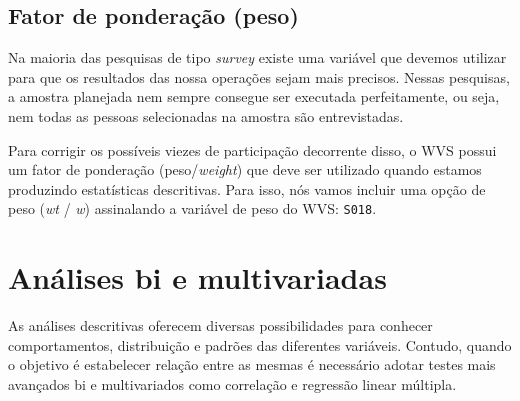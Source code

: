 \documentclass[
  10pt,
  brazil,
  a4paper,
  twoside, notitlepage, openright]{book}
\newenvironment{Shaded}{\begin{snugshade}}{\end{snugshade}}
\newcommand{\CommentTok}[1]{\textcolor[rgb]{0.56,0.35,0.01}{\textit{#1}}}
\newcommand{\DataTypeTok}[1]{\textcolor[rgb]{0.13,0.29,0.53}{#1}}
\newcommand{\KeywordTok}[1]{\textcolor[rgb]{0.13,0.29,0.53}{\textbf{#1}}}
\newcommand{\NormalTok}[1]{#1}
\newcommand{\OperatorTok}[1]{\textcolor[rgb]{0.81,0.36,0.00}{\textbf{#1}}}
\newcommand{\OtherTok}[1]{\textcolor[rgb]{0.56,0.35,0.01}{#1}}
\newcommand{\StringTok}[1]{\textcolor[rgb]{0.31,0.60,0.02}{#1}}
\begin{document}
\hypertarget{fator-de-ponderauxe7uxe3o-peso}{%
\subsection{Fator de ponderação (peso)}\label{fator-de-ponderauxe7uxe3o-peso}}

Na maioria das pesquisas de tipo \emph{survey} existe uma variável que devemos utilizar para que os resultados das nossa operações sejam mais precisos. Nessas pesquisas, a amostra planejada nem sempre consegue ser executada perfeitamente, ou seja, nem todas as pessoas selecionadas na amostra são entrevistadas.

Para corrigir os possíveis viezes de participação decorrente disso, o WVS possui um fator de ponderação (peso/\emph{weight}) que deve ser utilizado quando estamos produzindo estatísticas descritivas. Para isso, nós vamos incluir uma opção de peso (\emph{wt} / \emph{w}) assinalando a variável de peso do WVS: \texttt{S018}.

\begin{Shaded}
\end{Shaded}

\hypertarget{anuxe1lises-bi-e-multivariadas}{%
\section{Análises bi e multivariadas}\label{anuxe1lises-bi-e-multivariadas}}

As análises descritivas oferecem diversas possibilidades para conhecer comportamentos, distribuição e padrões das diferentes variáveis. Contudo, quando o objetivo é estabelecer relação entre as mesmas é necessário adotar testes mais avançados bi e multivariados como correlação e regressão linear múltipla.
\end{document}
